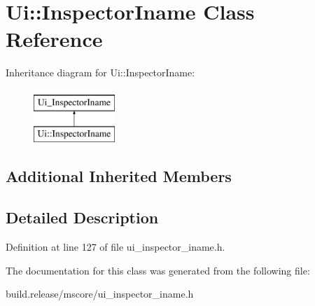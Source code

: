 \hypertarget{class_ui_1_1_inspector_iname}{}\section{Ui\+:\+:Inspector\+Iname Class Reference}
\label{class_ui_1_1_inspector_iname}
Inheritance diagram for Ui\+:\+:Inspector\+Iname\+:\begin{figure}[H]
\begin{center}
\leavevmode
\includegraphics[height=2.000000cm]{class_ui_1_1_inspector_iname}
\end{center}
\end{figure}
\subsection*{Additional Inherited Members}


\subsection{Detailed Description}


Definition at line 127 of file ui\+\_\+inspector\+\_\+iname.\+h.



The documentation for this class was generated from the following file\+:\begin{DoxyCompactItemize}
\item 
build.\+release/mscore/ui\+\_\+inspector\+\_\+iname.\+h\end{DoxyCompactItemize}
